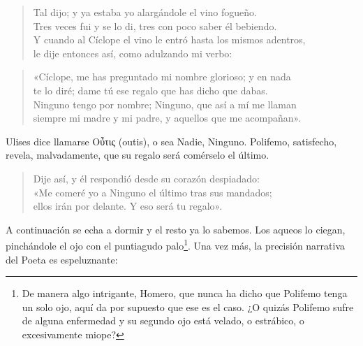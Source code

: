 \documentclass[11pt,a4paper]{article}
\newcommand{\gr}[1]{\foreignlanguage{greek}{#1}}
\begin{document}
\begin{verse}
Tal dijo; y ya estaba yo alargándole el vino fogueño.\\
Tres veces fui y se lo di, tres con poco saber él bebiendo.\\
Y cuando al Cíclope el vino le entró hasta los mismos adentros,\\
le dije entonces así, como adulzando mi verbo:
\end{verse}

\begin{verse}
«Cíclope, me has preguntado mi nombre glorioso; y en nada\\
te lo diré; dame tú ese regalo que has dicho que dabas.\\
Ninguno tengo por nombre; Ninguno, que así a mí me llaman\\
siempre mi madre y mi padre, y aquellos que me acompañan».
\end{verse}

Ulises dice llamarse \gr{Οὖτις} (outis), o sea Nadie, Ninguno. Polifemo, satisfecho, revela, malvadamente, que su regalo será comérselo el último.

\begin{verse}
Dije así, y él respondió desde su corazón despiadado:\\
«Me comeré yo a Ninguno el último tras sus mandados;\\
ellos irán por delante. Y eso será tu regalo».
\end{verse}

A continuación se echa a dormir y el resto ya lo sabemos. Los aqueos lo ciegan, pinchándole el ojo con el puntiagudo palo\footnote{De manera algo intrigante, Homero, que nunca ha dicho que Polifemo tenga un solo ojo, aquí da por supuesto que ese es el caso. ¿O quizás Polifemo sufre de alguna enfermedad y su segundo ojo está velado, o estrábico, o excesivamente miope?}. Una vez más, la precisión narrativa del Poeta es espeluznante:
\end{document}
